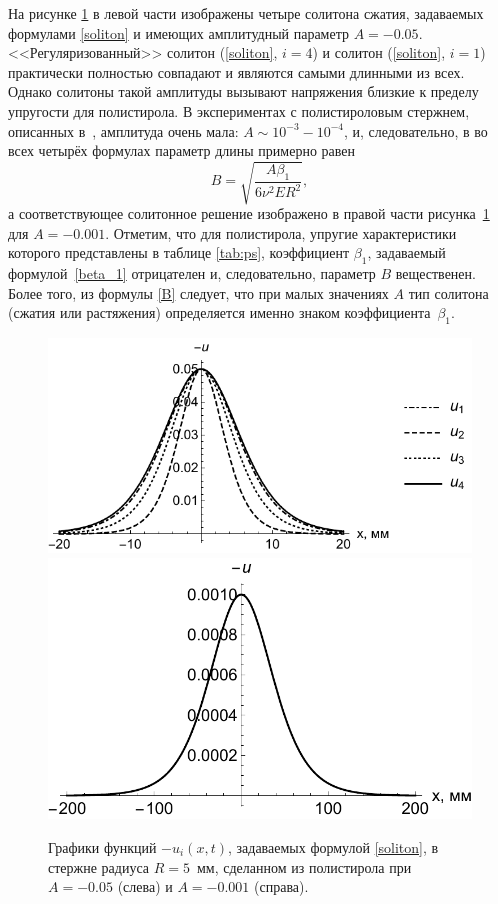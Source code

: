 \documentclass[12pt, a4paper]{article}
\begin{document}
На рисунке \ref{fig:soliton} в левой части изображены четыре солитона сжатия, задаваемых формулами \eqref{soliton} и имеющих амплитудный параметр $A = -0.05$.  <<Регуляризованный>> солитон (\ref{soliton}, $i=4$) и солитон (\ref{soliton}, $i=1$) практически полностью совпадают и являются самыми длинными из всех.
Однако солитоны такой амплитуды вызывают напряжения близкие к пределу упругости для полистирола. В экспериментах с полистироловым стержнем, описанных в~\cite{Garbuzov}, амплитуда очень мала: $A \sim 10^{-3} - 10^{-4}$, и, следовательно, в во всех четырёх формулах параметр длины примерно равен
\begin{equation}\label{B}
B = \sqrt{\frac{A\beta_1}{6\nu^2 E R^2}},
\end{equation}
а соответствующее солитонное решение изображено в правой части рисунка~\ref{fig:soliton} для $A = -0.001$.
Отметим, что для полистирола, упругие характеристики которого представлены в таблице \ref{tab:ps}, коэффициент $\beta_1$, задаваемый формулой~\eqref{beta_1} отрицателен и, следовательно, параметр $B$ вещественен. Более того, из формулы \eqref{B} следует, что при малых значениях $A$ тип солитона (сжатия или растяжения) определяется именно знаком коэффициента~$\beta_1$.
\begin{figure}[h]
	\centering
	\vspace{-9mm}
	\includegraphics[width=0.54\linewidth]{3a_FourSolitonsBlack}
	\includegraphics[width=0.42\linewidth]{3b_SingleSoliton}
	\caption{Графики функций $-u_i(x,t)$, задаваемых формулой \eqref{soliton}, в стержне радиуса $R = 5$~мм, сделанном из полистирола при $A = -0.05$ (слева) и $A= -0.001$ (справа).}
	\label{fig:soliton}
	\vspace{-3mm}
\end{figure}
\end{document}
